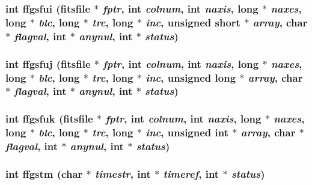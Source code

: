 \subsubsection{\setlength{\rightskip}{0pt plus 5cm}int ffgsfui (\bf{fitsfile} $\ast$ {\em fptr}, int {\em colnum}, int {\em naxis}, long $\ast$ {\em naxes}, long $\ast$ {\em blc}, long $\ast$ {\em trc}, long $\ast$ {\em inc}, unsigned short $\ast$ {\em array}, char $\ast$ {\em flagval}, int $\ast$ {\em anynul}, int $\ast$ {\em status})}\label{src_2fitsio_8h_c591c8ea9be72a7c242e8f102f6ba3b4}


\subsubsection{\setlength{\rightskip}{0pt plus 5cm}int ffgsfuj (\bf{fitsfile} $\ast$ {\em fptr}, int {\em colnum}, int {\em naxis}, long $\ast$ {\em naxes}, long $\ast$ {\em blc}, long $\ast$ {\em trc}, long $\ast$ {\em inc}, unsigned long $\ast$ {\em array}, char $\ast$ {\em flagval}, int $\ast$ {\em anynul}, int $\ast$ {\em status})}\label{src_2fitsio_8h_60eb38f1f62e5060ffca964466dd248e}


\subsubsection{\setlength{\rightskip}{0pt plus 5cm}int ffgsfuk (\bf{fitsfile} $\ast$ {\em fptr}, int {\em colnum}, int {\em naxis}, long $\ast$ {\em naxes}, long $\ast$ {\em blc}, long $\ast$ {\em trc}, long $\ast$ {\em inc}, unsigned int $\ast$ {\em array}, char $\ast$ {\em flagval}, int $\ast$ {\em anynul}, int $\ast$ {\em status})}\label{src_2fitsio_8h_8c55ce0c3ac249a3b00043f7872099f4}


\subsubsection{\setlength{\rightskip}{0pt plus 5cm}int ffgstm (char $\ast$ {\em timestr}, int $\ast$ {\em timeref}, int $\ast$ {\em status})}\label{src_2fitsio_8h_261640d215b78ccc9368b45915b4b199}


